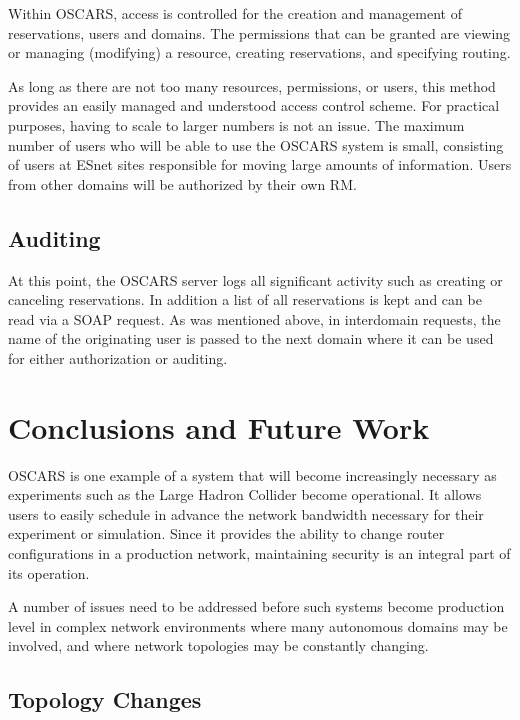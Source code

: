 \documentclass[conference]{IEEEtran}
\begin{document}
Within OSCARS, access is controlled for the creation and management of 
reservations, users and domains. The permissions that can
be granted are viewing or managing (modifying) a resource, creating
reservations, and specifying routing.

As long as there are not too many resources, permissions, or users, this
method provides an easily managed and understood access control scheme.
For practical purposes, having to scale to larger numbers is not an
issue.  The maximum number of users who will be able to use the OSCARS
system is small, consisting of users at ESnet sites responsible for moving
large amounts of information.  Users from other domains will be authorized by
their own RM.

\subsection{Auditing}
At this point, the OSCARS server logs all significant activity such as
creating or canceling reservations. In addition a list of all
reservations is kept and can be read via a SOAP request.
As was mentioned above, in interdomain requests, the name
of the originating user is passed to the next domain where it can be
used for either authorization or auditing.


\section{Conclusions and Future Work}

OSCARS is one example of a system that will become increasingly necessary
as experiments such as the Large Hadron Collider become operational.  It
allows users to easily schedule in advance the 
network bandwidth necessary for their experiment or simulation.  Since it
provides the ability to change router configurations in a production network,
maintaining security is an integral part of its operation.

A number of issues need to be addressed before such systems become
production level in complex network environments where many autonomous
domains may be involved, and where network topologies may be constantly
changing.

\subsection{Topology Changes}
\end{document}
